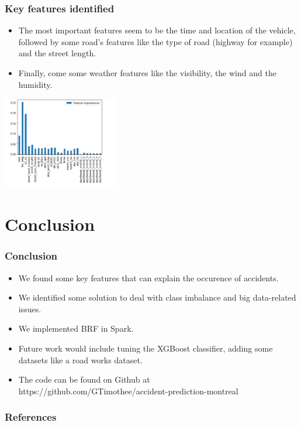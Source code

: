 \documentclass[slidestop,compress,red,mathserif]{beamer}
\begin{document}
\begin{frame}
	\frametitle{Key features identified}
	\begin{itemize}
		\item The most important features seem to be the time and location of the vehicle, followed by some road's features like the type of road (highway for example) and the street length.
    \item Finally, come some weather features like the visibility, the wind and the humidity.
	\end{itemize}
\centering
\includegraphics[height=4cm, keepaspectratio]{Figures/features.png}
\end{frame}

\section{Conclusion}

\begin{frame}
	\frametitle{Conclusion}
	\begin{itemize}
    \item We found some key features that can explain the occurence of accidents.
    \item We identified some solution to deal with class imbalance and big data-related issues.
    \item We implemented BRF in Spark.
    \item Future work would include tuning the XGBoost classifier, adding some datasets like a road works dataset.
    \item The code can be found on Github at https://github.com/GTimothee/accident-prediction-montreal
	\end{itemize}
\end{frame}


\begin{frame}[allowframebreaks]
\frametitle{References}

{\scriptsize




}


\end{frame}
\end{document}

